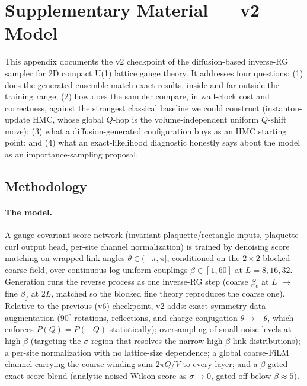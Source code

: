
\section{Supplementary Material --- v2 Model}
\label{sec:appendix-v2}

This appendix documents the v2 checkpoint of the diffusion-based inverse-RG
sampler for 2D compact U(1) lattice gauge theory. It addresses four
questions: (1) does the generated ensemble match exact results, inside and
far outside the training range; (2) how does the sampler compare, in
wall-clock cost and correctness, against the strongest classical baseline we
could construct (instanton-update HMC, whose global $Q$-hop is the
volume-independent uniform $Q$-shift move); (3) what a diffusion-generated
configuration buys as an HMC starting point; and (4) what an
exact-likelihood diagnostic honestly says about the model as an
importance-sampling proposal.

\subsection{Methodology}
\label{sec:appendix-v2-methods}

\paragraph{The model.} A gauge-covariant score network (invariant
plaquette/rectangle inputs, plaquette-curl output head, per-site channel
normalization) is trained by denoising score matching on wrapped link angles
$\theta \in (-\pi,\pi]$, conditioned on the $2\times 2$-blocked coarse
field, over continuous log-uniform couplings $\beta \in [1, 60]$ at
$L = 8, 16, 32$. Generation runs the reverse process as one inverse-RG step
(coarse $\beta_c$ at $L$ $\to$ fine $\beta_f$ at $2L$, matched so the
blocked fine theory reproduces the coarse one). Relative to the previous
(v6) checkpoint, v2 adds: exact-symmetry data augmentation ($90^\circ$
rotations, reflections, and charge conjugation $\theta \to -\theta$, which
enforces $P(Q) = P(-Q)$ statistically); oversampling of small noise levels
at high $\beta$ (targeting the $\sigma$-region that resolves the narrow
high-$\beta$ link distributions); a per-site normalization with no
lattice-size dependence; a global coarse-FiLM channel carrying the coarse
winding sum $2\pi Q/V$ to every layer; and a $\beta$-gated exact-score
blend (analytic noised-Wilson score as $\sigma \to 0$, gated off below
$\beta \approx 5$).

